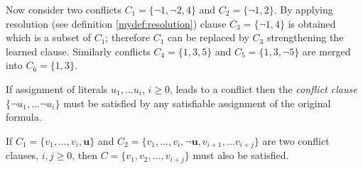 Now consider two conflicts $C_1 = \{ \neg 1, \neg 2, 4 \}$ and
$C_2 = \{ \neg 1, 2 \}$.  By applying resolution (see definition
\ref{mydef:resolution}) clause $C_3 = \{ \neg 1, 4 \}$ is obtained
which is a subset of $C_1$; therefore $C_1$ can be replaced by $C_3$
strengthening the learned clause. Similarly conflicts
$C_4 = \{ 1, 3, 5 \}$ and $C_5 = \{1, 3, \neg 5\}$ are merged
into $C_6 = \{ 1, 3 \}$.

\begin{myprop}
  If assignment of literals $u_1, \ldots u_i$, $i \ge 0$, leads to
  a conflict then the \emph{conflict clause} $\{ \neg u_1, \ldots
  \neg u_i \}$ must be satisfied by any satisfiable assignment of
  the original formula.
\end{myprop}

\begin{myprop}
  If $C_1 = \{ v_1, \ldots, v_i, \mathbf{u} \}$ and $C_2 = \{
  v_1, \ldots, v_i, \mathbf{\neg u}, v_{i+1}, \ldots v_{i+j} \}$
  are two conflict clauses, $i, j \ge 0$, then $C = \{ v_1, v_2,
  \ldots, v_{i+j} \}$ must also be satisfied.
\end{myprop}

